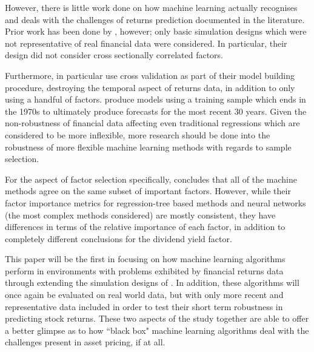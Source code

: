 \documentclass[a4paper, table]{article}
\newcommand{\smalltodo}[2][] {\todo[caption={#2}, size=\scriptsize,%
	fancyline,#1]{\begin{spacing}{.5}#2\end{spacing}}}
\newcommand{\rhs}[2][]{\smalltodo[color=green!30,#1]{{\bf RS:} #2}}
\begin{document}
However, there is little work done on how machine learning actually recognises and deals with the challenges of returns prediction documented in the literature. Prior work has been done by \cite{gu_empirical_2018}, however; only basic simulation designs which were not representative of real financial data were considered. In particular, their design did not consider cross sectionally correlated factors.

Furthermore, \cite{feng_deep_2018} in particular use cross validation as part of their model building procedure, destroying the temporal aspect of returns data, in addition to only using a handful of factors. \cite{gu_empirical_2018} produce models using a training sample which ends in the 1970s to ultimately produce forecasts for the most recent 30 years. Given the non-robustness of financial data affecting even traditional regressions which are considered to be more inflexible, more research should be done into the robustness of more flexible machine learning methods with regards to sample selection.

For the aspect of factor selection specifically, \cite{gu_empirical_2018} concludes that all of the machine methods agree on the same subset of important factors. However, while their factor importance metrics for regression-tree based methods and neural networks (the most complex methods considered) are mostly consistent, they have differences in terms of the relative importance of each factor, in addition to completely different conclusions for the dividend yield factor.

This paper will be the first in focusing on how machine learning algorithms perform in environments with problems exhibited by financial returns data through extending the simulation designs of \cite{gu_empirical_2018}. In addition, these algorithms will once again be evaluated on real world data, but with only more recent and representative data included in order to test their short term robustness in predicting stock returns. These two aspects of the study together are able to offer a better glimpse as to how ``black box" machine learning algorithms deal with the challenges present in asset pricing, if at all.



\end{document}

